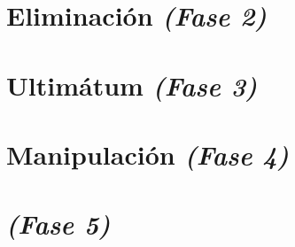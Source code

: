 \documentclass[11pt,a5paper]{book}
\begin{document}
\chapter{Eliminación \emph{\mdseries(Fase 2)}}


\chapter{Ultimátum \emph{\mdseries(Fase 3)}}


\chapter{Manipulación \emph{\mdseries(Fase 4)}}


\chapter{\emph{\mdseries(Fase 5)}}
%

\chapter{}
%

\chapter{}
%

\chapter{}
%

\chapter{}
%

\chapter{}
%

\chapter{}
%

\chapter{}
%

\begin{appendices}
\renewcommand{\thechapter}{\arabic{chapter}}
\chapter{}
\cftchapterprecistoc{}
%
\end{appendices}
\cleardoublepage
\end{document}
